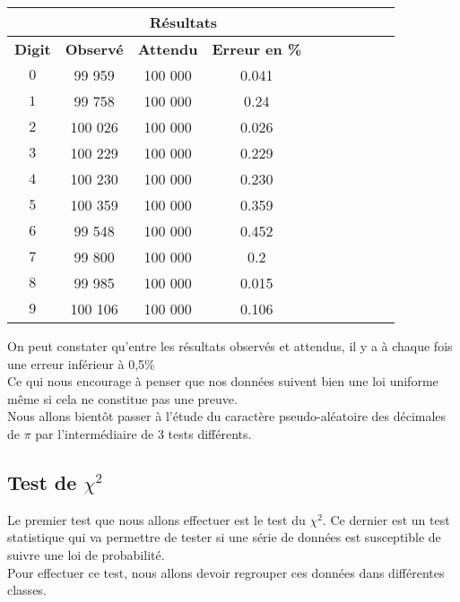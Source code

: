 \documentclass[french]{article}
\begin{document}
\begin{longtable}{|c|c|c|c|c|c|c|c|c|c|}
	\hline
	& \multicolumn{3}{c|}{\textbf{Résultats}} \\ 
	\hline 
	\textbf{Digit}  & \textbf{Observé} & \textbf{Attendu} & \textbf{Erreur en \%} \\ 
	\hline 
	$$0$$ & 99 959 & 100 000 & 0.041\\ 
	\hline 
	$$1$$ & 99 758 & 100 000 & 0.24\\ 
	\hline 
	$$2$$ & 100 026 & 100 000 & 0.026 \\ 
	\hline 
	$$3$$ & 100 229 & 100 000 & 0.229\\ 
	\hline 
	$$4$$ & 100 230 & 100 000 & 0.230\\ 
	\hline 
	$$5$$ & 100 359 & 100 000 & 0.359\\ 
	\hline 
	$$6$$ & 99 548 & 100 000 & 0.452\\ 
	\hline 
	$$7$$ & 99 800 & 100 000 & 0.2\\ 
	\hline 
	$$8$$ & 99 985 & 100 000 & 0.015\\ 
	\hline 
	$$9$$ & 100 106 & 100 000 & 0.106\\ 
	\hline
\end{longtable}

On peut constater qu'entre les résultats observés et attendus, il y a à chaque fois une
erreur inférieur à 0,5\%
\\
Ce qui nous encourage à penser que nos données suivent bien une loi uniforme même si cela ne 
constitue pas une preuve.
\\
Nous allons bientôt passer à l'étude du caractère pseudo-aléatoire des décimales de $\pi$
par l'intermédiaire de 3 tests différents.
\\
\subsection{Test de $\chi^{2}$ }
Le premier test que nous allons effectuer est le test du \textbf{$\chi^{2}$}. Ce dernier est un test statistique qui va permettre de tester si une série de données est susceptible de suivre une loi de probabilité.
\\
Pour effectuer ce test, nous allons devoir regrouper ces données dans différentes classes.
\end{document}

